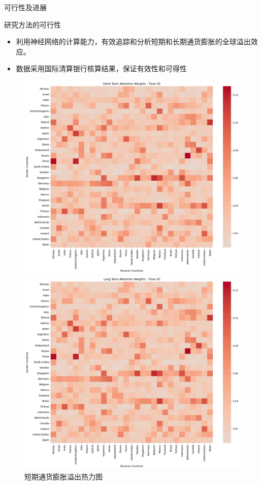 \documentclass{beamer}
\begin{document}
\begin{frame}{可行性及进展}
  \begin{block}{研究方法的可行性}
    \begin{itemize}
      \item 利用神经网络的计算能力，有效追踪和分析短期和长期通货膨胀的全球溢出效应。
      \item 数据采用国际清算银行核算结果，保证有效性和可得性
    \end{itemize}
  \end{block}

  \begin{figure}
    \centering
    \begin{minipage}{0.48\textwidth}
      \centering
      \includegraphics[width=\textwidth]{fig/short_term_spillover_heatmap.png}
      \caption{短期通货膨胀溢出热力图}
    \end{minipage}
    \hfill
    \begin{minipage}{0.48\textwidth}
      \centering
      \includegraphics[width=\textwidth]{fig/long_term_spillover_heatmap.png}

\end{minipage}
\end{figure}
\end{frame}
\end{document}
